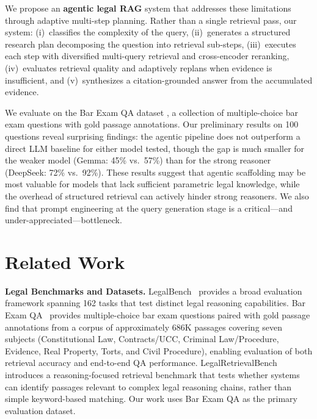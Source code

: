 \documentclass{article}
\begin{document}
We propose an \textbf{agentic legal RAG} system that addresses these limitations through adaptive multi-step planning. Rather than a single retrieval pass, our system: (i)~classifies the complexity of the query, (ii)~generates a structured research plan decomposing the question into retrieval sub-steps, (iii)~executes each step with diversified multi-query retrieval and cross-encoder reranking, (iv)~evaluates retrieval quality and adaptively replans when evidence is insufficient, and (v)~synthesizes a citation-grounded answer from the accumulated evidence.

We evaluate on the Bar Exam QA dataset \cite{barexamqa}, a collection of multiple-choice bar exam questions with gold passage annotations. Our preliminary results on 100 questions reveal surprising findings: the agentic pipeline does not outperform a direct LLM baseline for either model tested, though the gap is much smaller for the weaker model (Gemma: 45\% vs.\ 57\%) than for the strong reasoner (DeepSeek: 72\% vs.\ 92\%). These results suggest that agentic scaffolding may be most valuable for models that lack sufficient parametric legal knowledge, while the overhead of structured retrieval can actively hinder strong reasoners. We also find that prompt engineering at the query generation stage is a critical---and under-appreciated---bottleneck.

\section{Related Work}

\textbf{Legal Benchmarks and Datasets.}
LegalBench~\cite{guha2023legalbench} provides a broad evaluation framework spanning 162 tasks that test distinct legal reasoning capabilities. Bar Exam QA~\cite{barexamqa} provides multiple-choice bar exam questions paired with gold passage annotations from a corpus of approximately 686K passages covering seven subjects (Constitutional Law, Contracts/UCC, Criminal Law/Procedure, Evidence, Real Property, Torts, and Civil Procedure), enabling evaluation of both retrieval accuracy and end-to-end QA performance. LegalRetrievalBench~\cite{zheng2025legalretrievalbench} introduces a reasoning-focused retrieval benchmark that tests whether systems can identify passages relevant to complex legal reasoning chains, rather than simple keyword-based matching. Our work uses Bar Exam QA as the primary evaluation dataset.
\end{document}

